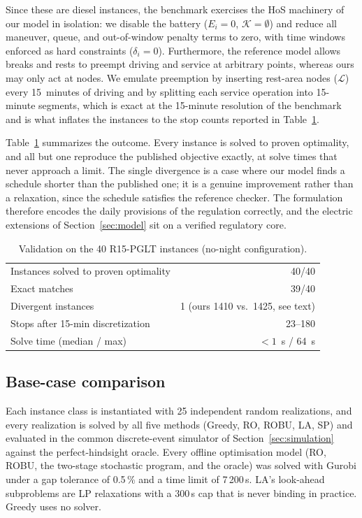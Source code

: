 Since these are diesel instances, the benchmark exercises the HoS machinery of our model in isolation: we disable the battery ($E_i = 0$, $\mathcal K = \emptyset$) and reduce all maneuver, queue, and out-of-window penalty terms to zero, with time windows enforced as hard constraints ($\delta_i = 0$). Furthermore, the reference model allows breaks and rests to preempt driving and service at arbitrary points, whereas ours may only act at nodes. We emulate preemption by inserting rest-area nodes ($\mathcal L$) every 15~minutes of driving and by splitting each service operation into 15-minute segments, which is exact at the 15-minute resolution of the benchmark and is what inflates the instances to the stop counts reported in Table~\ref{tab:validation}.

Table~\ref{tab:validation} summarizes the outcome. Every instance is solved to proven optimality, and all but one reproduce the published objective exactly, at solve times that never approach a limit. The single divergence is a case where our model finds a schedule shorter than the published one; it is a genuine improvement rather than a relaxation, since the schedule satisfies the reference checker. The formulation therefore encodes the daily provisions of the regulation correctly, and the electric extensions of Section~\ref{sec:model} sit on a verified regulatory core.

\begin{table}[htbp]
\centering
\caption{Validation on the 40 R15-PGLT instances (no-night configuration).}
\label{tab:validation}
\small
\begin{tabular}{lr}
\toprule
Instances solved to proven optimality & 40/40 \\
Exact matches & 39/40 \\
Divergent instances & 1 (ours 1410 vs.\ 1425, see text) \\
Stops after 15-min discretization & 23--180 \\
Solve time (median / max) & $<1$~s / 64~s \\
\bottomrule
\end{tabular}
\end{table}


\subsection{Base-case comparison}
\label{sec:basecase}

Each instance class is instantiated with 25 independent random realizations, and every realization is solved by all five methods (Greedy, RO, ROBU, LA, SP) and evaluated in the common discrete-event simulator of Section~\ref{sec:simulation} against the perfect-hindsight oracle. Every offline optimisation model (RO, ROBU, the two-stage stochastic program, and the oracle) was solved with Gurobi under a gap tolerance of 0.5\,\% and a time limit of 7\,200\,s. LA's look-ahead subproblems are LP relaxations with a 300\,s cap that is never binding in practice. Greedy uses no solver.

